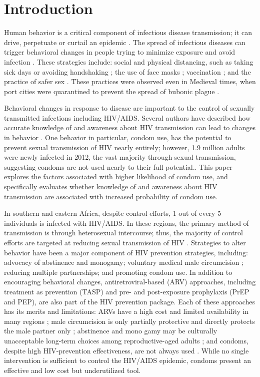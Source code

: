 \documentclass[10pt,letterpaper]{article}
\begin{document}
\section{Introduction}
Human behavior is a critical component of infectious disease transmission; it can drive, perpetuate or curtail an epidemic \cite{FunkGila09, Funk_2010}. The spread of infectious diseases can trigger behavioral changes in people trying to minimize exposure and avoid infection \cite{ FunkGila09, Funk_2010}. These strategies include: social and physical distancing, such as taking sick days or avoiding handshaking \cite{LauYang05,SchuBell11}; the use of face masks \cite{Lau_2005, Kristiansen_2007}; vaccination \cite{FunkGila09, Brewer_2007}; and the practice of safer sex \cite{Ahituv_1996}. These practices were observed even in Medieval times, when port cities were quarantined to prevent the spread of bubonic plague \cite{Gensini_2004}. 

Behavioral changes in response to disease are important to the control of sexually transmitted infections including HIV/AIDS. Several authors have described how accurate knowledge of and awareness about HIV transmission can lead to changes in behavior \cite{GregZhuw98, IjumGami04, MaciBrow01, Coates_2008}. One behavior in particular, condom use, has the potential to prevent sexual transmission of HIV nearly entirely; however, 1.9 million adults were newly infected in 2012, the vast majority through sexual transmission, suggesting condoms are not used nearly to their full potential.\cite{UNAIDS13}. This paper explores the factors associated with higher likelihood of condom use, and specifically evaluates whether knowledge of and awareness about HIV transmission are associated with increased probability of condom use.   

In southern and eastern Africa, despite control efforts, 1 out of every 5 individuals is infected with HIV/AIDS\cite{UNAIDS13}. In these regions,  the primary method of transmission is through heterosexual intercourse; thus, the majority of control efforts are targeted at reducing sexual transmission of HIV \cite{UNAIDS13}. Strategies to alter behavior have been a major component of HIV prevention strategies, including: advocacy of abstinence and monogamy; voluntary medical male circumcision \cite{Bailey_2007, Sawires_2007}; reducing multiple partnerships; and promoting condom use\cite{UNAIDS13}. In addition to encouraging behavioral changes, antiretroviral-based (ARV) approaches, including treatment as prevention (TASP) \cite{Cohen_2011} and  pre- and post-exposure prophylaxis (PrEP and PEP), are also part of the HIV prevention package. Each of these approaches has its merits and limitations: ARVs have a high cost and limited availability in many regions \cite{Egger_2005}; male circumcision is only partially protective and directly protects the male partner only \cite{Gray_2007}; abstinence and mono gamy may be culturally unacceptable long-term choices among reproductive-aged adults \cite{Vaughan_2000}; and condoms, despite high HIV-prevention effectiveness, are not always used \cite{AdihAlex99,KayiFors11}. While no single intervention is sufficient to control the HIV/AIDS epidemic, condoms present an effective and low cost but underutilized tool.
\end{document}
